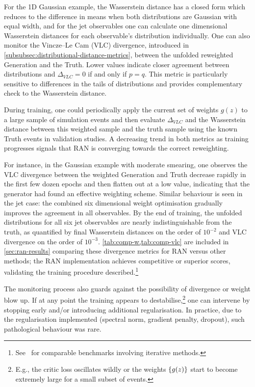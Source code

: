 {{        For the 1D Gaussian example, the Wasserstein distance has a closed form which reduces to the difference in means when both distributions are Gaussian with equal width, and for the jet observables one can calculate one dimensional Wasserstein distances for each observable’s distribution individually.
        One can also monitor the Vincze–Le Cam (VLC) divergence, introduced in \cref{subsubsec:distributional-distance-metrics}, between the unfolded reweighted Generation and the Truth.
        Lower values indicate closer agreement between distributions and $\Delta_{VLC}=0$ if and only if $p=q$.
        This metric is particularly sensitive to differences in the tails of distributions and provides complementary check to the Wasserstein distance.
        
        During training, one could periodically apply the current set of weights $g(z)$ to a large sample of simulation events and then evaluate $\Delta_{VLC}$ and the Wasserstein distance between this weighted sample and the truth sample using the known Truth events in validation studies.
        A decreasing trend in both metrics as training progresses signals that RAN is converging towards the correct reweighting.
        
        For instance, in the Gaussian example with moderate smearing, one observes the VLC divergence between the weighted Generation and Truth decrease rapidly in the first few dozen epochs and then flatten out at a low value, indicating that the generator had found an effective weighting scheme.
        Similar behaviour is seen in the jet case: the combined six dimensional weight optimisation gradually improves the agreement in all observables.
        By the end of training, the unfolded distributions for all six jet observables are nearly indistinguishable from the truth, as quantified by final Wasserstein distances on the order of $10^{-2}$ and VLC divergence on the order of $10^{-3}$.
        \cref{tab:comp-w,tab:comp-vlc} are included in \cref{sec:ran-results} comparing these divergence metrics for RAN versus other methods; the RAN implementation achieves competitive or superior scores, validating the training procedure described.\footnote{See~\cite{andreassen_omnifold_2020} for comparable benchmarks involving iterative methods.}

        The monitoring process also guards against the possibility of divergence or weight blow up.
        If at any point the training appears to destabilise,\footnote{E.g., the critic loss oscillates wildly or the weights $\qty{g(z)}$ start to become extremely large for a small subset of events.} one can intervene by stopping early and/or introducing additional regularisation.
        In practice, due to the regularisation implemented (spectral norm, gradient penalty, dropout), such pathological behaviour was rare.
        
}}
